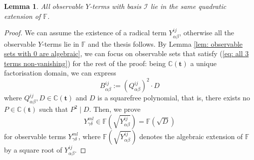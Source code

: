 \documentclass[10pt]{article}
\newtheorem{lem}{Lemma}%
\theoremstyle{remark}%
\theoremstyle{definition}%
\begin{document}
\begin{lem}
\label{lem: common squarefree} All observable $Y$-terms with basis $\mathcal{I}$ lie in the same quadratic extension of $\mathbb{F}$. 
\end{lem}
\begin{proof}
We can assume the existence of a radical term $Y_{\alpha\beta}^{ij}$, otherwise all the observable $Y$-terms lie in $\mathbb{F}$ and the thesis follows. 
By Lemma \ref{lem: observable sets with 0 are algebraic}, we can focus on observable sets that satisfy (\ref{eq: all 3 terms non-vanishing}) for the rest of the proof: being $\mathbb{C}(\mathbf{t})$ a unique factorisation domain, we can express 
 \begin{equation}
B_{\alpha\beta}^{ij}:=\left(Q_{\alpha\beta}^{ij}\right)^{2}\cdot D\label{eq: factorization square and squarefree}
 \end{equation}
where $Q_{\alpha\beta}^{ij},D\in\mathbb{C}(\mathbf{t})$ and $D$ is a squarefree polynomial, that is, there exists no $P\in\mathbb{C}(\mathbf{t})$ such that $P^{2}\mid D$. Then, we prove   
 \begin{equation}
Y_{\gamma\delta}^{ml}\in\mathbb{F}(\sqrt{Y_{\alpha\beta}^{ij}})=\mathbb{F}(\sqrt{D})
\label{eq: same algebraic extension}
 \end{equation}
for observable terms $Y_{\gamma\delta}^{ml}$, where $\mathbb{F}(\sqrt{Y_{\alpha\beta}^{ij}})$ denotes the algebraic extension of $\mathbb{F}$ by a square root of $Y_{\alpha\beta}^{ij}$.


\end{proof}
\end{document}

